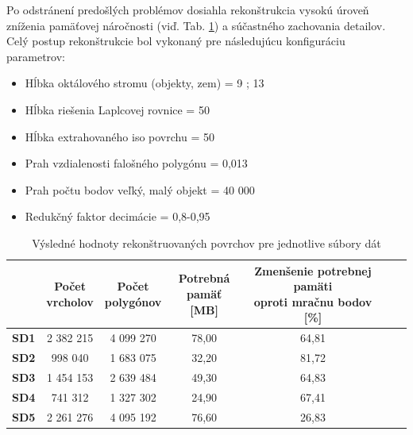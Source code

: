 \indent Po odstránení predošlých problémov dosiahla rekonštrukcia vysokú úroveň zníženia pamäťovej náročnosti (viď. Tab. \ref{table:mesh_results}) a súčastného zachovania detailov. Celý postup rekonštrukcie bol vykonaný pre následujúcu konfiguráciu parametrov:

\begin{itemize}
  \setlength\itemsep{0.2em}
  \item Hĺbka oktálového stromu (objekty, zem) = 9 ; 13
  \item Hĺbka riešenia Laplcovej rovnice = 50
  \item Hĺbka extrahovaného iso povrchu = 50
  \item Prah vzdialenosti falošného polygónu = 0,013
  \item Prah počtu bodov veľký, malý objekt = 40 000
  \item Redukčný faktor decimácie = 0,8-0,95
\end{itemize}

\begin{table} [!h]
  \begin{center} %
      \begin{tabular}{|c || c | c | c | c | c| c|} 
       \hline
        & \thead{Počet \\ vrcholov} &
          \thead{Počet \\ polygónov} &
          \thead{Potrebná \\ pamäť [MB]} &
          \thead{Zmenšenie potrebnej pamäti \\ oproti mračnu bodov [\%]} \\ [0.5ex]    
       \hline\hline
       \textbf{SD1} & 2 382 215  & 4 099 270 & 78,00 & 64,81 \\ 
       \hline
       \textbf{SD2} & 998 040  & 1 683 075 & 32,20 & 81,72 \\
       \hline
       \textbf{SD3} &  1 454 153  & 2 639 484 & 49,30 & 64,83 \\
       \hline
       \textbf{SD4} & 741 312  & 1 327 302 & 24,90 & 67,41 \\
       \hline
       \textbf{SD5} & 2 261 276  & 4 095 192 & 76,60 & 26,83 \\ 
       \hline
      \end{tabular}
  \caption{Výsledné hodnoty rekonštruovaných povrchov pre jednotlive súbory dát}
  \label{table:mesh_results}
  \end{center}
\end{table}

